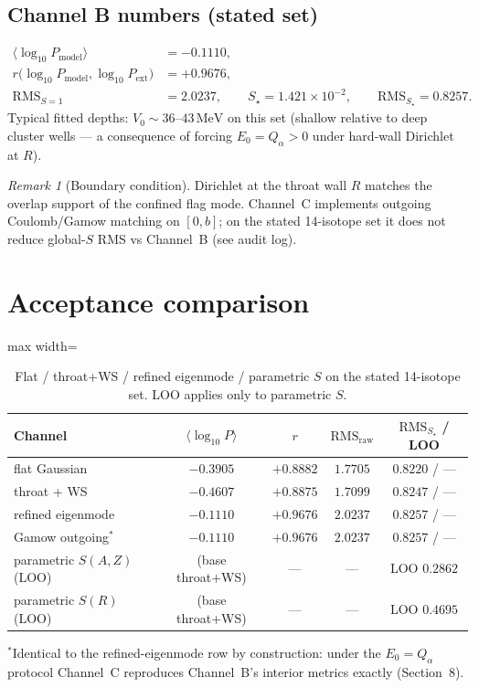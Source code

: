 \documentclass[11pt,a4paper]{article}
\theoremstyle{remark}
\newtheorem*{remark}{Remark}
\begin{document}
\subsection{Channel B numbers (stated set)}
\begin{align*}
\langle\log_{10}P_{\mathrm{model}}\rangle &= -0.1110,\\
r\bigl(\log_{10}P_{\mathrm{model}},\log_{10}P_{\mathrm{ext}}\bigr)
&= +0.9676,\\
\mathrm{RMS}_{S=1} &= 2.0237,\qquad
S_\star=1.421\times 10^{-2},\qquad
\mathrm{RMS}_{S_\star}=0.8257.
\end{align*}
Typical fitted depths: $V_0\sim 36$--$43\,\mathrm{MeV}$ on this set
(shallow relative to deep cluster wells --- a consequence of forcing
$E_0=Q_\alpha>0$ under hard-wall Dirichlet at $R$).

\begin{remark}[Boundary condition]
Dirichlet at the throat wall $R$ matches the overlap support of the
confined flag mode.  Channel~C implements outgoing Coulomb/Gamow
matching on $[0,b]$; on the stated 14-isotope set it does not reduce
global-$S$ RMS vs Channel~B (see audit log).
\end{remark}

\section{Acceptance comparison}

\begin{table}[H]
\centering
\caption{Flat / throat+WS / refined eigenmode / parametric $S$ on the
stated 14-isotope set.  LOO applies only to parametric $S$.}
\label{tab:accept}
\scriptsize
\renewcommand{\arraystretch}{0.85}
\begin{adjustbox}{max width=\linewidth}\begin{tabular}{lcccc}
\toprule
\textbf{Channel} & $\langle\log_{10}P\rangle$ & $r$ & $\mathrm{RMS}_{\mathrm{raw}}$
 & $\mathrm{RMS}_{S_\star}$ / LOO \\
\midrule
flat Gaussian & $-0.3905$ & $+0.8882$ & $1.7705$ & $0.8220$ / --- \\
throat + WS & $-0.4607$ & $+0.8875$ & $1.7099$ & $0.8247$ / --- \\
refined eigenmode & $-0.1110$ & $+0.9676$ & $2.0237$ & $0.8257$ / --- \\
Gamow outgoing$^{*}$ & $-0.1110$ & $+0.9676$ & $2.0237$ & $0.8257$ / --- \\
parametric $S(A,Z)$ (LOO) & (base throat+WS) & --- & --- & LOO $0.2862$ \\
parametric $S(R)$ (LOO) & (base throat+WS) & --- & --- & LOO $0.4695$ \\
\bottomrule
\end{tabular}\end{adjustbox}

\vspace{0.3em}
{\footnotesize $^{*}$Identical to the refined-eigenmode row by construction:
under the $E_0 = Q_\alpha$ protocol Channel~C reproduces Channel~B's interior
metrics exactly (Section~8).}
\end{table}
\end{document}
